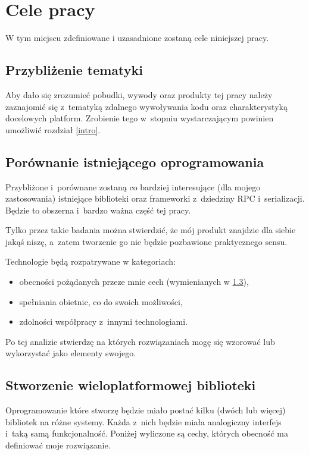 \section{Cele pracy}
W tym miejscu zdefiniowane i uzasadnione zostaną cele niniejszej pracy.


\subsection{Przybliżenie tematyki}
Aby dało się zrozumieć pobudki, wywody oraz produkty tej pracy należy zaznajomić się z~tematyką zdalnego wywoływania kodu oraz charakterystyką docelowych platform. Zrobienie tego w~stopniu wystarczającym powinien umożliwić rozdział \ref{intro}.

\subsection{Porównanie istniejącego oprogramowania}
Przybliżone i~porównane zostaną co bardziej interesujące (dla mojego zastosowania) istniejące biblioteki oraz frameworki z~dziedziny RPC i~serializacji. Będzie to obszerna i~bardzo ważna część tej pracy.

Tylko przez takie badania można stwierdzić, że mój produkt znajdzie dla siebie jakąś niszę, a~zatem tworzenie go nie będzie pozbawione praktycznego sensu.

Technologie będą rozpatrywane w kategoriach:
\begin{itemize}
	\item obecności pożądanych przeze mnie cech (wymienianych w \ref{lib_requirements}),
	\item spełniania obietnic, co do swoich możliwości,
	\item zdolności współpracy z~innymi technologiami.
\end{itemize}

Po tej analizie stwierdzę na których rozwiązaniach mogę się wzorować lub wykorzystać jako elementy swojego.

\subsection{Stworzenie wieloplatformowej biblioteki}
\label{lib_requirements}
Oprogramowanie które stworzę będzie miało postać kilku (dwóch lub więcej) bibliotek na różne systemy. Każda z~nich będzie miała analogiczny interfejs i~taką samą funkcjonalność. Poniżej wyliczone są cechy, których obecność ma definiować moje rozwiązanie.


